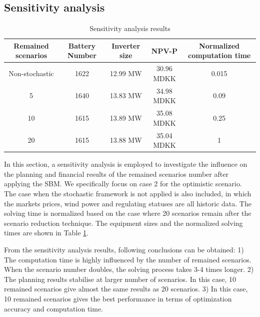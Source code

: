\documentclass[final,5p,times,twocolumn,authoryear]{elsarticle}
\begin{document}
\subsection{Sensitivity analysis}\label{sec:sensitivity}
\begin{table}[h!]
    \centering
     \caption{Sensitivity analysis results}
    \begin{tabular}{ccccc}
    \hline
        \textbf{Remained scenarios} & \textbf{Battery Number} &\textbf{Inverter size}
        &\textbf{NPV-P}
        & \textbf{Normalized computation time}\\
         \hline
         Non-stochastic & 1622 & 12.99 MW & 30.96 MDKK & 0.015\\
         5&1640 & 13.83 MW& 34.98 MDKK & 0.09\\
         10  & 1615&13.89 MW& 35.08 MDKK & 0.25\\
         20&1615 &13.88 MW&35.04 MDKK&1 \\
         \hline
    \end{tabular}
    \label{tab:sensitivity}
\end{table}
In this section, a sensitivity analysis is employed to investigate the influence on the planning and financial results of the remained scenarios number after applying the SBM. We specifically focus on case 2 for the optimistic scenario. The case when the stochastic framework is not applied is also included, in which the markets prices, wind power and regulating statuses are all historic data. The solving time is normalized based on the case where 20 scenarios remain after the scenario reduction technique. The equipment sizes and the normalized solving times are shown in Table \ref{tab:sensitivity}.

From the sensitivity analysis results, following conclusions can be obtained: 1) The computation time is highly influenced by the number of remained scenarios. When the scenario number doubles, the solving process takes 3-4 times longer. 2) The planning results stabilise at larger number of scenarios. In this case, 10 remained scenarios give almost the same results as 20 scenarios. 3) In this case, 10 remained scenarios gives the best performance in terms of optimization accuracy and computation time.
\end{document}
